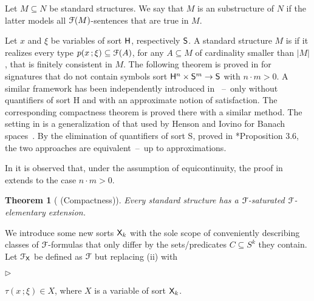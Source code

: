\documentclass{amsproc}
\newcommand{\mylabel}[1]{{#1}\hfill}
\renewenvironment{itemize}
  {\begin{list}{$\triangleright$}{%
  \setlength{\parskip}{0mm}
  \setlength{\topsep}{.1\baselineskip}
  \setlength{\rightmargin}{0mm}
  \setlength{\listparindent}{0mm}
  \setlength{\itemindent}{0mm}
  \setlength{\labelwidth}{3ex}
  \setlength{\itemsep}{.1\baselineskip}
  \setlength{\parsep}{.1\baselineskip}
  \setlength{\partopsep}{0mm}
  \setlength{\labelsep}{1ex}
  \setlength{\leftmargin}{\labelwidth+\labelsep}
  \let\makelabel\mylabel}}{%
\end{list}}
\newcounter{thm}
\theoremstyle{mio}
\newtheorem{theorem}[thm]{Theorem}\tcolorboxenvironment{theorem}{mythm}
\newtheorem{remark}[thm]{Remark}\tcolorboxenvironment{remark}{mythm}
\renewcommand*{\emph}[1]{%
   \smash{\tikz[baseline]\node[rectangle, fill=teal!25, rounded corners, inner xsep=0.5ex, inner ysep=0.2ex, anchor=base, minimum height = 2.7ex]{\strut #1};}}
\begin{document}

 Let $M\subseteq N$ be standard structures.
 We say that $M$ is an \emph{${\EuScript F}$-elementary\/} substructure of $N$ if the latter models all ${\EuScript F}(M)$-sentences that are true in $M$.

 Let $x$ and $\xi$ be variables of sort ${\sf H}$, respectively ${\sf S}$.
 A standard structure $M$ is \emph{${\EuScript F}$-saturated\/} if it realizes every type $p(x\,;\xi)\subseteq{\EuScript F}(A)$, for any $A\subseteq M$ of cardinality smaller than $|M|$, that is finitely consistent in $M$.
 The following theorem is proved in \cite{clcl} for signatures that do not contain symbols sort ${\sf H}^n\times{\sf S}^m\to {\sf S}$ with $n{\cdot}m>0$.
 A similar framework has been independently introduced in \cite{CP}~--~only without quantifiers of sort {\sf H} and with an approximate notion of satisfaction.
 The corresponding compactness theorem is proved there with a similar method.
 The setting in \cite{CP} is a generalization of that used by Henson and Iovino for Banach spaces~\cite{HI}.
 By the elimination of quantifiers of sort {\sf S}, proved in \cite{clcl}*{Proposition 3.6}, the two approaches are equivalent~--~up to approximations.

 In \cite{Z} it is observed that, under the assumption of equicontinuity, the proof in \cite{clcl} extends to the case $n{\cdot}m> 0$.

 \begin{theorem}[ (Compactness)]\label{thm_compactness}
  Every standard structure has a ${\EuScript F}$-saturated ${\EuScript F}$-elementary extension.
\end{theorem}

We introduce some new sorts ${\sf X}_k$ with the sole scope of conveniently describing classes of ${\EuScript F}$-formulas that only differ by the sets/predicates $C\subseteq S^k$ they contain.
Let ${\EuScript F}_{\sf X}$ be defined as ${\EuScript F}$ but replacing (ii) with\smallskip

\begin{itemize}
  \item[iii.] $\tau(x\,;\xi)\in X$, where $X$ is a variable of sort ${\sf X}_k$.
\end{itemize}
\end{document}
